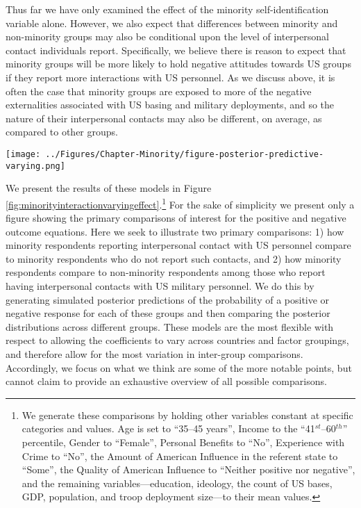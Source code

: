 


Thus far we have only examined the effect of the minority self-identification variable alone. However, we also expect that differences between minority and non-minority groups may also be conditional upon the level of interpersonal contact individuals report. Specifically, we believe there is reason to expect that minority groups will be more likely to hold negative attitudes towards US groups if they report more interactions with US personnel. As we discuss above, it is often the case that minority groups are exposed to more of the negative externalities associated with US basing and military deployments, and so the nature of their interpersonal contacts may also be different, on average, as compared to other groups. 


\begin{sidewaysfigure}[h!p]
	\centering\texttt{[image: ../Figures/Chapter-Minority/figure-posterior-predictive-varying.png]}
	\caption{Posterior predictive check for varying effect models. Darkened dots with credible intervals show the mean predicted count of the outcome categories based on 1,000 simulations from the model. Light blue vars show the actual count of each outcome category as observed in the data. Better fitting models should produce simulated values that are closer to the actual observed data.}
	\label{fig:minorityvaryingppcheck}
\end{sidewaysfigure}



We present the results of these models in Figure \ref{fig:minorityinteractionvaryingeffect}.\footnote{We generate these comparisons by holding other variables constant at specific categories and values. Age is set to ``35--45 years'', Income to the ``41$^{st}$--60$^{th}$'' percentile, Gender to ``Female'', Personal Benefits to ``No'', Experience with Crime to ``No'', the Amount of American Influence in the referent state to ``Some'', the Quality of American Influence to ``Neither positive nor negative'', and the remaining variables---education, ideology, the count of US bases, GDP, population, and troop deployment size---to their mean values.} For the sake of simplicity we present only a figure showing the primary comparisons of interest for the positive and negative outcome equations. Here we seek to illustrate two primary comparisons: 1) how minority respondents reporting interpersonal contact with US personnel compare to minority respondents who do not report such contacts, and 2) how minority respondents compare to non-minority respondents among those who report having interpersonal contacts with US military personnel. We do this by generating simulated posterior predictions of the probability of a positive or negative response for each of these groups and then comparing the posterior distributions across different groups. These models are the most flexible with respect to allowing the coefficients to vary across countries and factor groupings, and therefore allow for the most variation in inter-group comparisons. Accordingly, we focus on what we think are some of the more notable points, but cannot claim to provide an exhaustive overview of all possible comparisons.

